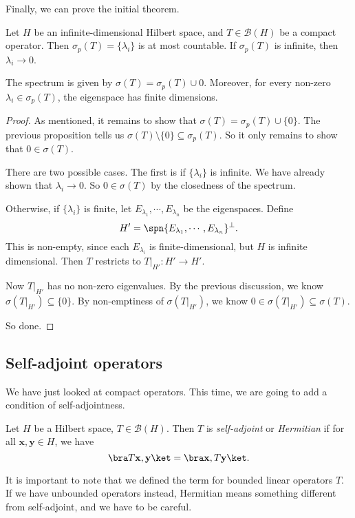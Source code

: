 \documentclass[a4paper]{article}
\begin{document}
Finally, we can prove the initial theorem.
\begin{thm}
  Let $H$ be an infinite-dimensional Hilbert space, and $T \in \mathcal{B}(H)$ be a compact operator. Then $\sigma_p(T) = \{\lambda_i\}$ is at most countable. If $\sigma_p(T)$ is infinite, then $\lambda_i \to 0$.

  The spectrum is given by $\sigma(T) = \sigma_p(T) \cup 0$. Moreover, for every non-zero $\lambda_i \in \sigma_p (T)$, the eigenspace has finite dimensions.
\end{thm}

\begin{proof}
  As mentioned, it remains to show that $\sigma(T) = \sigma_p(T) \cup \{0\}$. The previous proposition tells us $\sigma(T) \setminus \{0\} \subseteq \sigma_p(T)$. So it only remains to show that $0 \in \sigma(T)$.

  There are two possible cases. The first is if $\{\lambda_i\}$ is infinite. We have already shown that $\lambda_i \to 0$. So $0 \in \sigma(T)$ by the closedness of the spectrum.

  Otherwise, if $\{\lambda_i\}$ is finite, let $E_{\lambda_1}, \cdots, E_{\lambda_n}$ be the eigenspaces. Define
  \[
    H' = \spn\{E_{\lambda_1}, \cdots, E_{\lambda_n}\}^\perp.
  \]
  This is non-empty, since each $E_{\lambda_i}$ is finite-dimensional, but $H$ is infinite dimensional. Then $T$ restricts to $T|_{H'}: H' \to H'$.

  Now $T|_{H'}$ has no non-zero eigenvalues. By the previous discussion, we know $\sigma(T|_{H'}) \subseteq \{0\}$. By non-emptiness of $\sigma(T|_{H'})$, we know $0 \in \sigma(T|_{H'}) \subseteq \sigma(T)$.

  So done.
\end{proof}

\subsection{Self-adjoint operators}
We have just looked at compact operators. This time, we are going to add a condition of self-adjointness.

\begin{defi}
  Let $H$ be a Hilbert space, $T \in \mathcal{B}(H)$. Then $T$ is \emph{self-adjoint} or \emph{Hermitian} if for all $\mathbf{x}, \mathbf{y} \in H$, we have
  \[
    \bra T \mathbf{x}, \mathbf{y}\ket = \bra \mathbf{x}, T \mathbf{y}\ket.
  \]
\end{defi}
It is important to note that we defined the term for bounded linear operators $T$. If we have unbounded operators instead, Hermitian means something different from self-adjoint, and we have to be careful.
\end{document}
